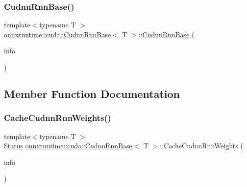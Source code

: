 \subsubsection{\texorpdfstring{Cudnn\+Rnn\+Base()}{CudnnRnnBase()}}
{\footnotesize\ttfamily template$<$typename T $>$ \\
\mbox{\hyperlink{classonnxruntime_1_1cuda_1_1CudnnRnnBase}{onnxruntime\+::cuda\+::\+Cudnn\+Rnn\+Base}}$<$ T $>$\+::\mbox{\hyperlink{classonnxruntime_1_1cuda_1_1CudnnRnnBase}{Cudnn\+Rnn\+Base}} (\begin{DoxyParamCaption}\item[{const \mbox{\hyperlink{classonnxruntime_1_1OpKernelInfo}{Op\+Kernel\+Info}} \&}]{info }\end{DoxyParamCaption})\hspace{0.3cm}{\ttfamily [inline]}}



\subsection{Member Function Documentation}
\mbox{\label{classonnxruntime_1_1cuda_1_1CudnnRnnBase_a8a9e22cbec1bc69d53a557a53a6fe790}} 
\subsubsection{\texorpdfstring{Cache\+Cudnn\+Rnn\+Weights()}{CacheCudnnRnnWeights()}}
{\footnotesize\ttfamily template$<$typename T $>$ \\
\mbox{\hyperlink{classonnxruntime_1_1common_1_1Status}{Status}} \mbox{\hyperlink{classonnxruntime_1_1cuda_1_1CudnnRnnBase}{onnxruntime\+::cuda\+::\+Cudnn\+Rnn\+Base}}$<$ T $>$\+::Cache\+Cudnn\+Rnn\+Weights (\begin{DoxyParamCaption}\item[{const \mbox{\hyperlink{classonnxruntime_1_1OpKernelInfo}{Op\+Kernel\+Info}} \&}]{info }\end{DoxyParamCaption})}

\mbox{\label{classonnxruntime_1_1cuda_1_1CudnnRnnBase_ab7e2e0912ffc9b23069b9a2fee25aa2b}} 
